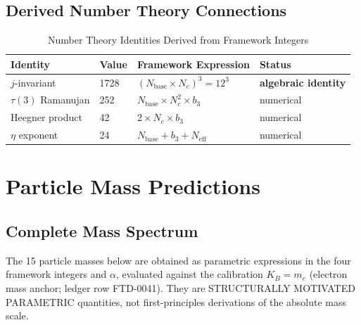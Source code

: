 \documentclass[11pt,a4paper]{article}
\begin{document}
\subsection{Derived Number Theory Connections}

\begin{table}[H]
\centering
\caption{Number Theory Identities Derived from Framework Integers}
\begin{tabular}{llll}
\toprule
\textbf{Identity} & \textbf{Value} & \textbf{Framework Expression} & \textbf{Status} \\
\midrule
$j$-invariant & 1728 & $(N_{\text{base}} \times N_c)^3 = 12^3$ & \textbf{algebraic identity} \\
$\tau(3)$ Ramanujan & 252 & $N_{\text{base}} \times N_c^2 \times b_3$ & numerical \\
Heegner product & 42 & $2 \times N_c \times b_3$ & numerical \\
$\eta$ exponent & 24 & $N_{\text{base}} + b_3 + N_{\text{eff}}$ & numerical \\
\bottomrule
\end{tabular}
\end{table}

\section{Particle Mass Predictions}

\subsection{Complete Mass Spectrum}

The 15 particle masses below are obtained as parametric expressions in the four framework integers and $\alpha$, evaluated against the calibration $K_B = m_e$ (electron mass anchor; ledger row FTD-0041). They are STRUCTURALLY MOTIVATED PARAMETRIC quantities, not first-principles derivations of the absolute mass scale.
\end{document}
